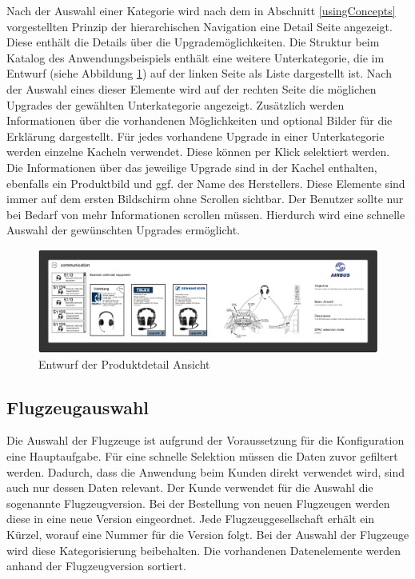 Nach der Auswahl einer Kategorie wird nach dem in Abschnitt \ref{usingConcepts} vorgestellten Prinzip der hierarchischen Navigation eine Detail Seite angezeigt. Diese enthält die Details über die Upgrademöglichkeiten. Die Struktur beim Katalog des Anwendungsbeispiels enthält eine weitere Unterkategorie, die im Entwurf (siehe Abbildung \ref{detailSketch}) auf der linken Seite als Liste dargestellt ist. Nach der Auswahl eines dieser Elemente wird auf der rechten Seite die möglichen Upgrades der gewählten Unterkategorie angezeigt. Zusätzlich werden Informationen über die vorhandenen Möglichkeiten und optional Bilder für die Erklärung dargestellt.  Für jedes vorhandene Upgrade in einer Unterkategorie werden einzelne Kacheln verwendet. Diese können per Klick selektiert werden. Die Informationen über das jeweilige Upgrade sind in der Kachel enthalten, ebenfalls ein Produktbild und ggf. der Name des Herstellers. Diese Elemente sind immer auf dem ersten Bildschirm ohne Scrollen sichtbar. Der Benutzer sollte nur bei Bedarf von mehr Informationen scrollen müssen. Hierdurch wird eine schnelle Auswahl der gewünschten Upgrades ermöglicht. 
\begin{figure}
\centering
\includegraphics[width=\hsize]{images/detail_entwurf}
\caption{Entwurf der Produktdetail Ansicht}
\label{detailSketch}
\end{figure}

\subsection{Flugzeugauswahl}
Die Auswahl der Flugzeuge ist aufgrund der Voraussetzung für die Konfiguration eine Hauptaufgabe. Für eine schnelle Selektion müssen die Daten zuvor gefiltert werden. Dadurch, dass die Anwendung beim Kunden direkt verwendet wird, sind auch nur dessen Daten relevant. Der Kunde verwendet für die Auswahl die sogenannte Flugzeugversion. Bei der Bestellung von neuen Flugzeugen werden diese in eine neue Version eingeordnet. Jede Flugzeuggesellschaft erhält ein Kürzel, worauf eine Nummer für die Version folgt. Bei der Auswahl der Flugzeuge wird diese Kategorisierung beibehalten. Die vorhandenen Datenelemente werden anhand der Flugzeugversion sortiert. \par

